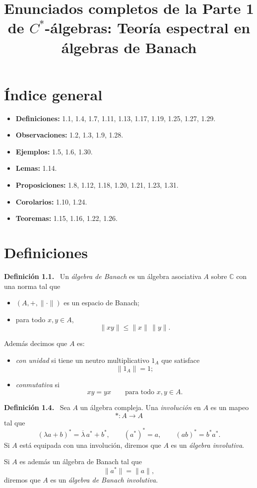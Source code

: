 \documentclass[11pt]{article}
\title{Enunciados completos de la Parte 1 de $C^*$-álgebras: Teoría espectral en álgebras de Banach}
\author{}
\date{}
\newenvironment{definicion}[1]
  {\par\medskip\noindent\textbf{Definición #1.}\ }
  {\par\medskip}
\begin{document}
\maketitle

\section*{Índice general}
\begin{itemize}[leftmargin=*]
  \item \textbf{Definiciones:} 1.1, 1.4, 1.7, 1.11, 1.13, 1.17, 1.19, 1.25, 1.27, 1.29.
  \item \textbf{Observaciones:} 1.2, 1.3, 1.9, 1.28.
  \item \textbf{Ejemplos:} 1.5, 1.6, 1.30.
  \item \textbf{Lemas:} 1.14.
  \item \textbf{Proposiciones:} 1.8, 1.12, 1.18, 1.20, 1.21, 1.23, 1.31.
  \item \textbf{Corolarios:} 1.10, 1.24.
  \item \textbf{Teoremas:} 1.15, 1.16, 1.22, 1.26.
\end{itemize}

\section*{Definiciones}


\begin{definicion}{1.1}
Un \emph{álgebra de Banach} es un álgebra asociativa $A$ sobre $\mathbb{C}$ con una norma tal que
\begin{itemize}[leftmargin=2em]
  \item $(A,+,\lVert\cdot\rVert)$ es un espacio de Banach;
  \item para todo $x,y\in A$,
  \[
    \lVert xy\rVert\leq \lVert x\rVert\,\lVert y\rVert.
  \]
\end{itemize}
Además decimos que $A$ es:
\begin{itemize}[leftmargin=2em]
  \item \emph{con unidad} si tiene un neutro multiplicativo $1_A$ que satisface
  \[
    \lVert 1_A\rVert=1;
  \]
  \item \emph{conmutativa} si
  \[
    xy=yx
    \qquad\text{para todo }x,y\in A.
  \]
\end{itemize}
\end{definicion}

\begin{definicion}{1.4}
Sea $A$ un álgebra compleja. Una \emph{involución} en $A$ es un mapeo
\[
  *:A\longrightarrow A
\]
tal que
\[
  (\lambda a+b)^*=\overline{\lambda}\,a^*+b^*,
  \qquad
  (a^*)^*=a,
  \qquad
  (ab)^*=b^*a^*.
\]
Si $A$ está equipada con una involución, diremos que $A$ es un \emph{álgebra involutiva}.

Si $A$ es además un álgebra de Banach tal que
\[
  \lVert a^*\rVert=\lVert a\rVert,
\]
diremos que $A$ es un \emph{álgebra de Banach involutiva}.
\end{definicion}
\end{document}
